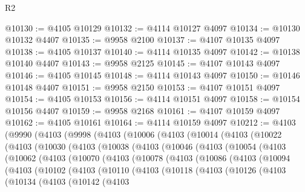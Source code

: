 \begin{lexlean}{R2}
\begin{coremodule}
@10130 := @4105 @10129
@10132 := @4114 @10127 @4097
@10134 := @10130 @10132 @4407
@10135 := @9958 @2100
@10137 := @4107 @10135 @4097
@10138 := @4105 @10137
@10140 := @4114 @10135 @4097
@10142 := @10138 @10140 @4407
@10143 := @9958 @2125
@10145 := @4107 @10143 @4097
@10146 := @4105 @10145
@10148 := @4114 @10143 @4097
@10150 := @10146 @10148 @4407
@10151 := @9958 @2150
@10153 := @4107 @10151 @4097
@10154 := @4105 @10153
@10156 := @4114 @10151 @4097
@10158 := @10154 @10156 @4407
@10159 := @9958 @2168
@10161 := @4107 @10159 @4097
@10162 := @4105 @10161
@10164 := @4114 @10159 @4097
@10212 := @4103
    (@9990
      (@4103
        (@9998
          (@4103
            (@10006
              (@4103
                (@10014
                  (@4103
                    (@10022
                      (@4103
                        (@10030
                          (@4103
                            (@10038
                              (@4103
                                (@10046
                                  (@4103
                                    (@10054
                                      (@4103
                                        (@10062
                                          (@4103
                                            (@10070
                                              (@4103
                                                (@10078
                                                  (@4103
                                                    (@10086
                                                      (@4103
                                                        (@10094
                                                          (@4103
                                                            (@10102
                                                              (@4103
                                                                (@10110
                                                                  (@4103
                                                                    (@10118
                                                                      (@4103
                                                                        (@10126
                                                                          (@4103
                                                                            (@10134
                                                                              (@4103
                                                                                (@10142
                                                                                  (@4103

\end{coremodule}
\end{lexlean}
